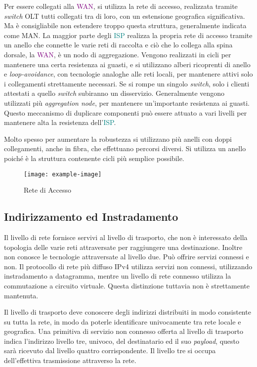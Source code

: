 \documentclass{article}
\numberwithin{equation}{subsection}
\begin{document}
Per essere collegati alla \textcolor{purple}{WAN}, si utilizza la rete di accesso, realizzata tramite \textit{switch} OLT tutti collegati tra di loro, con un estensione geografica significativa. 
Ma è consigliabile non estendere troppo questa struttura, generalmente indicata come MAN. 
La maggior parte degli \textcolor{teal}{ISP} realizza la propria rete di accesso tramite un anello che connette le varie reti di raccolta e ciò che lo collega alla spina dorsale, la \textcolor{purple}{WAN}, è un nodo di aggregazione. 
Vengono realizzati in cicli per mantenere una certa resistenza ai guasti, e si utilizzano alberi ricoprenti di anello e \textit{loop-avoidance}, con tecnologie analoghe alle 
reti locali, per mantenere attivi solo i collegamenti strettamente necessari. 
Se si rompe un singolo \textit{switch}, solo i clienti attestati a quello \textit{switch} subiranno un disservizio. Generalmente vengono utilizzati più \textit{aggregation node}, per mantenere 
un'importante resistenza ai guasti. Questo meccanismo di duplicare componenti può essere attuato a vari livelli per mantenere alta la resistenza dell'\textcolor{teal}{ISP}. 

Molto spesso per aumentare la robustezza si utilizzano più anelli con doppi collegamenti, anche in fibra, che effettuano percorsi diversi. 
Si utilizza un anello poiché è la struttura contenente cicli più semplice possibile. 

\begin{figure}[H]%
    \centering%
    \texttt{[image: example-image]}%
    \caption{Rete di Accesso}%
\end{figure}

\subsection{Indirizzamento ed Instradamento}

Il livello di rete fornisce servivi al livello di trasporto, che non è interessato della topologia delle varie reti attraversate per raggiungere una destinazione. Inoltre 
non conosce le tecnologie attraversate al livello due. Può offrire servizi connessi e non. Il protocollo di rete più diffuso \textcolor{BurntOrange}{IPv4} utilizza servizi 
non connessi, utilizzando instradamento a datagramma, mentre un livello di rete connesso utilizza la commutazione a circuito virtuale. Questa distinzione tuttavia non è 
strettamente mantenuta. 

Il livello di trasporto deve conoscere degli indirizzi distribuiti in modo consistente su tutta la rete, in modo da poterle identificare univocamente tra rete locale 
e geografica. Una primitiva di servizio non connesso offerta al livello di trasporto indica l'indirizzo livello tre, univoco, del destinatario ed il suo \textit{payload}, questo sarà ricevuto 
dal livello quattro corrispondente. Il livello tre si occupa dell'effettiva trasmissione attraverso la rete. 
\end{document}
